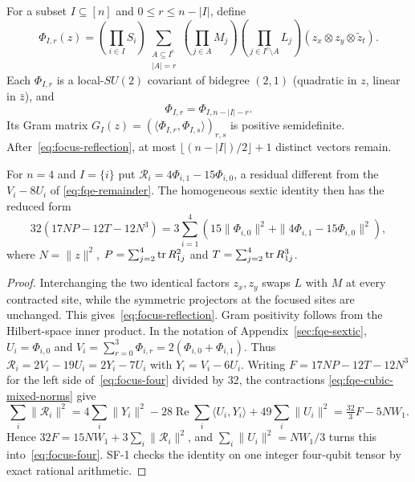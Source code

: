 \begin{proposition}\label{prop:focus}
For a subset $I\subseteq[n]$ and $0\le r\le n-|I|$, define
\[
 \Phi_{I,r}(z)=\left(\prod_{i\in I}S_i\right)
 \sum_{\substack{A\subseteq I^c\\|A|=r}}
 \left(\prod_{j\in A}M_j\right)
 \left(\prod_{j\in I^c\setminus A}L_j\right)
 (z_x\otimes z_y\otimes\widetilde z_t).
\]
Each $\Phi_{I,r}$ is a local-$SU(2)$ covariant of bidegree $(2,1)$ (quadratic in $z$, linear in $\bar z$), and
\begin{equation}\label{eq:focus-reflection}
 \Phi_{I,r}=\Phi_{I,n-|I|-r}.
\end{equation}
Its Gram matrix $G_I(z)=(\langle\Phi_{I,r},\Phi_{I,s}\rangle)_{r,s}$
is positive semidefinite. After~\eqref{eq:focus-reflection}, at most
$\lfloor(n-|I|)/2\rfloor+1$ distinct vectors remain.

For $n=4$ and $I=\{i\}$ put $\mathcal R_i=4\Phi_{i,1}-15\Phi_{i,0}$, a residual different from the
$V_i-8U_i$ of \eqref{eq:fqe-remainder}. The
homogeneous sextic identity then has the reduced form
\begin{equation}\label{eq:focus-four}
32(17NP-12T-12N^3)
=3\sum_{i=1}^4\left(
 15\|\Phi_{i,0}\|^2+
 \|4\Phi_{i,1}-15\Phi_{i,0}\|^2\right),
\end{equation}
where $N=\|z\|^2$, $P=\sum_{j=2}^4\operatorname{tr} R_{1j}^2$ and
$T=\sum_{j=2}^4\operatorname{tr} R_{1j}^3$.
\end{proposition}
\begin{proof}
Interchanging the two identical factors $z_x,z_y$ swaps $L$ with
$M$ at every contracted site, while the symmetric projectors at the
focused sites are unchanged. This gives~\eqref{eq:focus-reflection}.
Gram positivity follows from the Hilbert-space inner product.
In the notation of Appendix~\ref{sec:fqe-sextic}, $U_i=\Phi_{i,0}$ and
$V_i=\sum_{r=0}^3\Phi_{i,r}=2(\Phi_{i,0}+\Phi_{i,1})$.
Thus $\mathcal R_i=2V_i-19U_i=2Y_i-7U_i$ with $Y_i=V_i-6U_i$. Writing $F=17NP-12T-12N^3$ for the
left side of~\eqref{eq:focus-four} divided by $32$, the contractions
\eqref{eq:fqe-cubic-mixed-norms} give
\[
 \sum_i\|\mathcal R_i\|^2=4\sum_i\|Y_i\|^2-28\operatorname{Re}\sum_i\langle U_i,Y_i\rangle+49\sum_i\|U_i\|^2
 =\tfrac{32}3F-5NW_1 .
\]
Hence $32F=15NW_1+3\sum_i\|\mathcal R_i\|^2$, and $\sum_i\|U_i\|^2=NW_1/3$ turns this
into~\eqref{eq:focus-four}. SF-1 checks the identity on one integer four-qubit tensor by exact rational arithmetic.
\end{proof}


